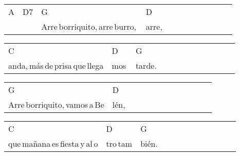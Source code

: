 \begin{multicols}{2}
\noindent
\begin{minipage}{\columnwidth}
\noindent
\noindent
\begin{tabular}{llllllllllll}
A&D7&G&D\\
\quad\,\,\,&\quad\quad\,\,&Arre\,borriquito,\,arre\,burro,\,&arre,
\end{tabular}

\noindent
\begin{tabular}{llllllllllll}
C&D&G\\
anda,\,más\,de\,prisa\,que\,llega&mos\,&tarde.
\end{tabular}

\noindent
\begin{tabular}{llllllllllll}
G&D\\
Arre\,borriquito,\,vamos\,a\,Be&lén,
\end{tabular}

\noindent
\begin{tabular}{llllllllllll}
C&D&G\\
que\,mañana\,es\,fiesta\,y\,al\,o&tro\,tam&bién.
\end{tabular}
\end{minipage}\\

\end{multicols}